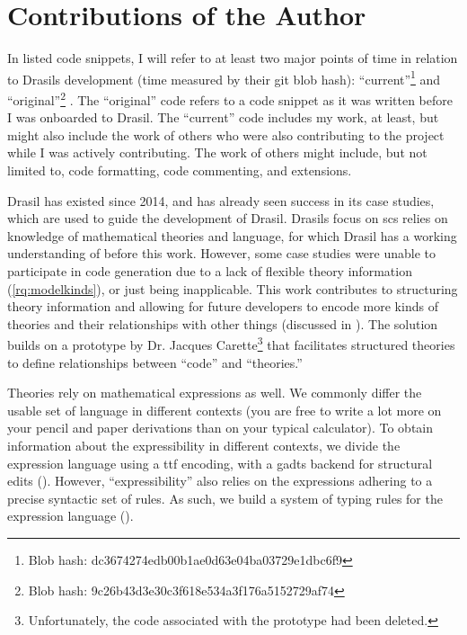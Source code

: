 \section{Contributions of the Author}
\label{sec:intro:contributions}

In listed code snippets, I will refer to at least two major points of time in
relation to Drasils development (time measured by their git blob hash):
``current''\footnote{Blob hash: dc3674274edb00b1ae0d63e04ba03729e1dbc6f9} and
``original''\footnote{Blob hash: 9c26b43d3e30c3f618e534a3f176a5152729af74}
. The ``original'' code refers
to a code snippet as it was written before I was onboarded to Drasil. The
``current'' code includes my work, at least, but might also include the work of
others who were also contributing to the project while I was actively
contributing. The work of others might include, but not limited to, code
formatting, code commenting, and extensions.

Drasil has existed since 2014, and has already seen success in its case studies,
which are used to guide the development of Drasil. Drasils focus on \acs{scs}
relies on knowledge of mathematical theories and language, for which Drasil has
a working understanding of before this work. However, some case studies were
unable to participate in code generation due to a lack of flexible theory
information (\ref{rq:modelkinds}), or just being inapplicable. This work
contributes to structuring theory information and allowing for future developers
to encode more kinds of theories and their relationships with other things
(discussed in ). The solution builds on a prototype by Dr.
Jacques Carette\footnote{Unfortunately, the code associated with the prototype
had been deleted.} that facilitates structured theories to define relationships
between ``code'' and ``theories.''

Theories rely on mathematical expressions as well. We commonly differ the usable
set of language in different contexts (you are free to write a lot more on your
pencil and paper derivations than on your typical calculator). To obtain
information about the expressibility in different contexts, we divide the
expression language using a \acs{ttf} \cite{Carette2009} encoding, with a
\acsp{gadt} backend for structural edits (). However,
``expressibility'' also relies on the expressions adhering to a precise
syntactic set of rules. As such, we build a system of typing rules for the
expression language ().

